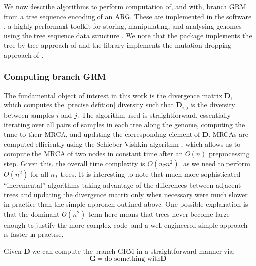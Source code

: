 We now describe algorithms to perform computation of, and with, branch GRM
from a tree sequence encoding of an ARG.
%
These are implemented in the \tskit{} software \citep{ralph2020efficiently, kelleher2024tskit},
a highly performant toolkit for storing, manipulating, and analysing genomes using the tree sequence data structure
\citep{kelleher2016efficient, kelleher2018efficient, wong2023general}.
%
We note that the \eGRM{} package implements the tree-by-tree approach of
\citet{fan2022genealogical} and the \ARGneedlelib{} library implements the
mutation-dropping approach of \citet{zhang2023biobank}.

\subsubsection{Computing branch GRM}

The fundamental object of interest in this work is the divergence matrix $\mathbf{D}$,
which computes the [precise defition] diversity 
such that $\mathbf{D}_{i, j}$ is the diversity between samples $i$ and $j$.
%
The algorithm used is straightforward, essentially iterating
over all pairs of samples in each tree along the genome, computing the
time to their MRCA, and updating the corresponding element of $\mathbf{D}$.
%
MRCAs are computed efficiently using the Schieber-Vishkin
algorithm \citep{Schieber1988On} ,
which allows us to compute the MRCA of two nodes in constant time
after an $O(n)$ preprocessing step.
%
Given this, the overall time complexity is $O(n_T n^2)$,
as we need to perform $O(n^2)$ for all $n_T$ trees.
%
It is interesting to note that much more sophisticated
``incremental'' algorithms taking advantage of the differences between
adjacent trees and updating the divergence matrix only when necessary
were much slower in practice than the simple approach outlined above.
%
One possible explanation is that the dominant $O(n^2)$ term here means
that trees never become large enough to justify the more complex
code, and a well-engineered simple approach is faster in practise.

Given $\mathbf{D}$ we can compute the branch GRM in a straightforward manner via:
%
\[
\mathbf{G} = \mbox{do something with}\mathbf{D}
\]

